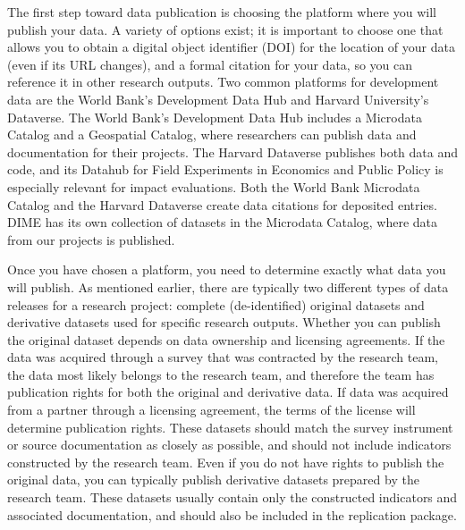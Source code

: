 The first step toward data publication is choosing the platform
where you will publish your data.
A variety of options exist;
it is important to choose one that allows you to obtain a digital object identifier (DOI)
for the location of your data (even if its URL changes),
and a formal citation for your data, so you can reference it in other research outputs.
Two common platforms for development data are the World Bank's Development Data Hub
and Harvard University's Dataverse.
The World Bank's Development Data Hub
includes a Microdata Catalog
and a Geospatial Catalog,
where researchers can publish data and documentation for their projects.
The Harvard Dataverse publishes both data and code,
and its Datahub for Field Experiments in Economics and Public Policy
is especially relevant for impact evaluations.
Both the World Bank Microdata Catalog and the Harvard Dataverse
create data citations for deposited entries.
DIME has its own collection of datasets in the Microdata Catalog,
where data from our projects is published.

Once you have chosen a platform, you need to determine exactly what data you will publish.
As mentioned earlier, there are typically two different types of data releases for a research project:
complete (de-identified) original datasets and derivative datasets used for specific research outputs.
Whether you can publish the original dataset depends on data ownership and licensing agreements.
If the data was acquired through a survey that was contracted by the research team,
the data most likely belongs to the research team,
and therefore the team has publication rights for both the original and derivative data.
If data was acquired from a partner through a licensing agreement,
the terms of the license will determine publication rights.
These datasets should match the survey instrument or source documentation as closely as possible,
and should not include indicators constructed by the research team.
Even if you do not have rights to publish the original data,
you can typically publish derivative datasets prepared by the research team.
These datasets usually contain only the constructed indicators and associated documentation,\cite{dupriez2007}
and should also be included in the replication package.

